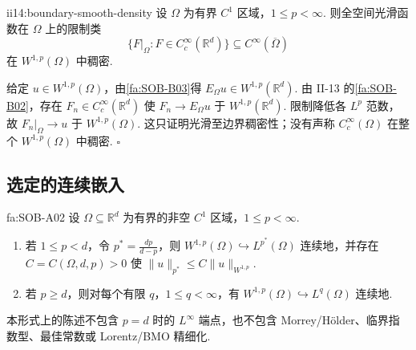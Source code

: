 \begin{FALemma}[B][边界光滑稠密性]{ii14:boundary-smooth-density}
设 \(\displaystyle\Omega\) 为有界 \(\displaystyle C^1\) 区域，\(\displaystyle1\leqslant p<\infty\). 则全空间光滑函数在 \(\displaystyle\Omega\) 上的限制类
\[
\{F|_\Omega:F\in C_c^\infty(\mathbb R^d)\}
\subseteq C^\infty(\overline\Omega)
\]
在 \(\displaystyle W^{1,p}(\Omega)\) 中稠密.
\end{FALemma}

\begin{FAProof}
给定 \(\displaystyle u\in W^{1,p}(\Omega)\)，由\autoref{fa:SOB-B03}得 \(\displaystyle E_\Omega u\in W^{1,p}(\mathbb R^d)\). 由 II-13 的\autoref{fa:SOB-B02}，存在 \(\displaystyle F_n\in C_c^\infty(\mathbb R^d)\) 使 \(\displaystyle F_n\to E_\Omega u\) 于 \(\displaystyle W^{1,p}(\mathbb R^d)\). 限制降低各 \(\displaystyle L^p\) 范数，故 \(\displaystyle F_n|_\Omega\to u\) 于 \(\displaystyle W^{1,p}(\Omega)\). 这只证明光滑至边界稠密性；没有声称 \(\displaystyle C_c^\infty(\Omega)\) 在整个 \(\displaystyle W^{1,p}(\Omega)\) 中稠密.
\hfill\(\square\)
\end{FAProof}

\subsection{选定的连续嵌入}

\begin{FATheorem}{fa:SOB-A02}
设 \(\displaystyle\Omega\subseteq\mathbb R^d\) 为有界的非空 \(\displaystyle C^1\) 区域，\(\displaystyle1\leqslant p<\infty\).
\begin{enumerate}[label=\textup{(\alph*)}]
\item 若 \(\displaystyle1\leqslant p<d\)，令 \(\displaystyle p^*=\frac{dp}{d-p}\)，则 \(\displaystyle W^{1,p}(\Omega)\hookrightarrow L^{p^*}(\Omega)\) 连续地，并存在 \(\displaystyle C=C(\Omega,d,p)>0\) 使 \(\displaystyle\|u\|_{p^*}\leqslant C\|u\|_{W^{1,p}}\).
\item 若 \(\displaystyle p\geqslant d\)，则对每个有限 \(\displaystyle q\)，\(\displaystyle1\leqslant q<\infty\)，有 \(\displaystyle W^{1,p}(\Omega)\hookrightarrow L^q(\Omega)\) 连续地.
\end{enumerate}
本形式上的陈述不包含 \(\displaystyle p=d\) 时的 \(\displaystyle L^\infty\) 端点，也不包含 Morrey/Hölder、临界指数型、最佳常数或 Lorentz/BMO 精细化.
\end{FATheorem}

